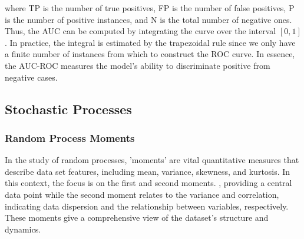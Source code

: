 
where TP is the number of true positives, FP is the number of false positives, P is the number of positive instances, and N is the total number of negative ones. Thus, the AUC can be computed by integrating the curve over the interval $[0,1]$. In practice, the integral is estimated by the trapezoidal rule since we only have a finite number of instances from which to construct the ROC curve. In essence, the AUC-ROC measures the model's ability to discriminate positive from negative cases.

\subsection{Stochastic Processes}

\subsubsection{Random Process Moments}
 
In the study of random processes, 'moments' are vital quantitative measures that describe data set features, including mean, variance, skewness, and kurtosis. In this context, the focus is on the first and second moments. , providing a central data point while the second moment relates to the variance and correlation, indicating data dispersion and the relationship between variables, respectively. These moments give a comprehensive view of the dataset's structure and dynamics.

